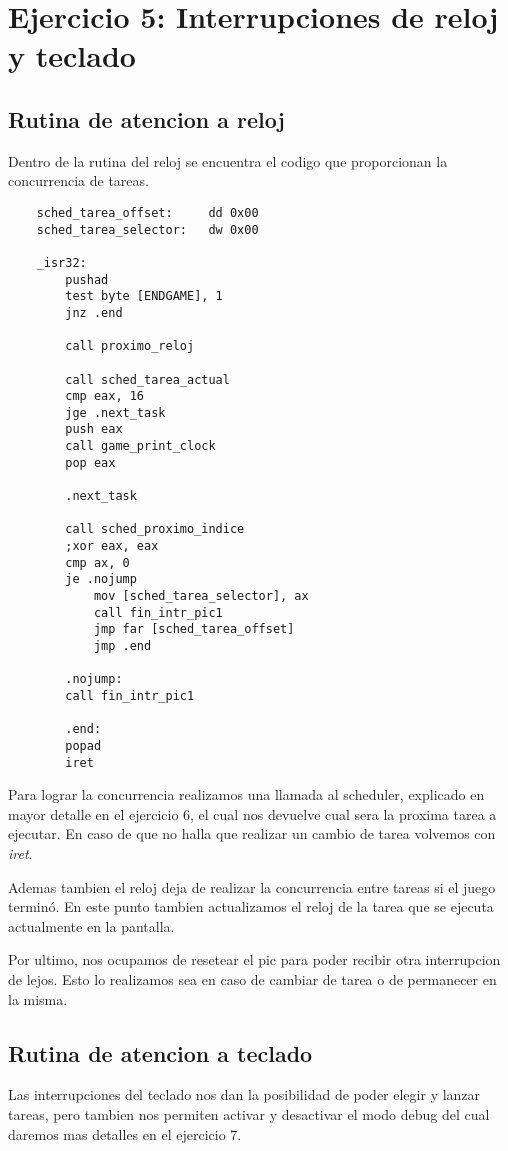 \section{Ejercicio 5: Interrupciones de reloj y teclado}

	\subsection{Rutina de atencion a reloj}
	Dentro de la rutina del reloj se encuentra el codigo que proporcionan la concurrencia de tareas.

	\begin{lstlisting}
	sched_tarea_offset:     dd 0x00
	sched_tarea_selector:   dw 0x00

	_isr32:
	    pushad
	    test byte [ENDGAME], 1
	    jnz .end

    	call proximo_reloj

	    call sched_tarea_actual
	    cmp eax, 16 
	    jge .next_task
	    push eax
	    call game_print_clock
	    pop eax

	    .next_task

	    call sched_proximo_indice 
	    ;xor eax, eax
	    cmp ax, 0
	    je .nojump
	        mov [sched_tarea_selector], ax
	        call fin_intr_pic1
	        jmp far [sched_tarea_offset]
	        jmp .end

	    .nojump:
	    call fin_intr_pic1

	    .end:
	    popad
	    iret
	\end{lstlisting}

	Para lograr la concurrencia realizamos una llamada al scheduler, explicado en mayor detalle en el ejercicio 6, el cual nos devuelve cual sera la proxima tarea a ejecutar. En caso de que no halla que realizar un cambio de tarea volvemos con \textit{iret}. 

	Ademas tambien el reloj deja de realizar la concurrencia entre tareas si el juego terminó. En este punto tambien actualizamos el reloj de la tarea que se ejecuta actualmente en la pantalla. 

	Por ultimo, nos ocupamos de resetear el pic para poder recibir otra interrupcion de lejos. Esto lo realizamos sea en caso de cambiar de tarea o de permanecer en la misma.

	\subsection{Rutina de atencion a teclado}
	Las interrupciones del teclado nos dan la posibilidad de poder elegir y lanzar tareas, pero tambien nos permiten activar y desactivar el modo debug del cual daremos mas detalles en el ejercicio 7.

